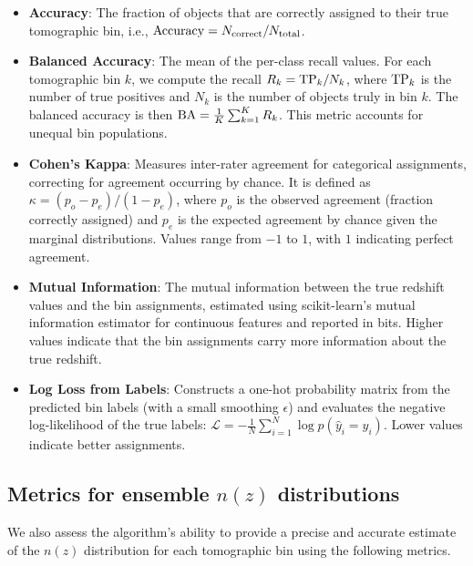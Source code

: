 \documentclass[11pt,twoside,letterpaper,onecolumn,english]{article}
\begin{document}
\begin{itemize}
    \item \textbf{Accuracy}: The fraction of objects that are correctly
      assigned to their true tomographic bin, i.e.,
      ${\rm Accuracy} = N_{\rm correct} / N_{\rm total}$.

    \item \textbf{Balanced Accuracy}: The mean of the per-class recall
      values. For each tomographic bin $k$, we compute the recall
      $R_k = {\rm TP}_k / N_k$, where ${\rm TP}_k$ is the number of
      true positives and $N_k$ is the number of objects truly in bin $k$.
      The balanced accuracy is then
      ${\rm BA} = \frac{1}{K}\sum_{k=1}^{K} R_k$.
      This metric accounts for unequal bin populations.

    \item \textbf{Cohen's Kappa}: Measures inter-rater agreement for
      categorical assignments, correcting for agreement occurring by
      chance. It is defined as
      $\kappa = (p_o - p_e) / (1 - p_e)$,
      where $p_o$ is the observed agreement (fraction correctly
      assigned) and $p_e$ is the expected agreement by chance given
      the marginal distributions.  Values range from $-1$ to $1$,
      with $1$ indicating perfect agreement.

    \item \textbf{Mutual Information}: The mutual information between
      the true redshift values and the bin assignments, estimated
      using scikit-learn's mutual information estimator for continuous
      features and reported in bits.  Higher values indicate that the
      bin assignments carry more information about the true redshift.

    \item \textbf{Log Loss from Labels}: Constructs a one-hot
      probability matrix from the predicted bin labels (with a small
      smoothing $\epsilon$) and evaluates the negative
      log-likelihood of the true labels:
      $\mathcal{L} = -\frac{1}{N}\sum_{i=1}^{N} \log p(\hat{y}_i = y_i)$.
      Lower values indicate better assignments.
\end{itemize}


\subsection{\texorpdfstring{Metrics for ensemble $n(z)$ distributions}{Metrics for ensemble n(z) distributions}}

We also assess the algorithm's ability to provide a precise and
accurate estimate of the $n(z)$ distribution for each
tomographic bin using the following metrics.
\end{document}

